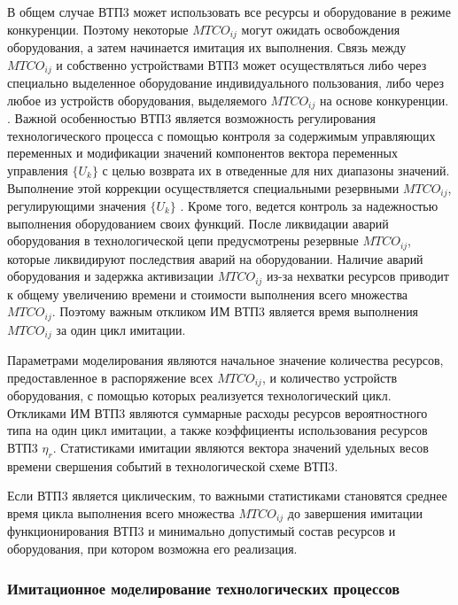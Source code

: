В общем случае ВТП3 может использовать все ресурсы и оборудование в режиме конкуренции. Поэтому некоторые $MTCO_{ij}$ могут ожидать освобождения оборудования, а затем начинается имитация их выполнения. Связь между $MTCO_{ij}$ и собственно устройствами ВТП3 может осуществляться либо через специально выделенное оборудование индивидуального пользования, либо через любое из устройств оборудования, выделяемого $MTCO_{ij}$ на основе конкуренции. . Важной особенностью ВТП3 является возможность регулирования технологического процесса с помощью контроля за содержимым управляющих переменных и модификации значений компонентов вектора переменных управления $\{U_k\}$ с целью возврата их в отведенные для них диапазоны значений. Выполнение этой коррекции осуществляется специальными резервными $MTCO_{ij}$, регулирующими значения $\{U_k\}$ . Кроме того, ведется контроль за надежностью выполнения оборудованием своих функций. После ликвидации аварий оборудования в технологической цепи предусмотрены резервные $MTCO_{ij}$, которые ликвидируют последствия аварий на оборудовании. Наличие аварий оборудования и задержка активизации $MTCO_{ij}$ из-за нехватки ресурсов приводит к общему увеличению времени и стоимости выполнения всего множества {$MTCO_{ij}$}. Поэтому важным откликом ИМ ВТП3 является время выполнения {$MTCO_{ij}$} за один цикл имитации.

Параметрами моделирования являются начальное значение количества ресурсов, предоставленное в распоряжение всех $MTCO_{ij}$, и количество устройств оборудования, с помощью которых реализуется технологический цикл. Откликами ИМ ВТП3 являются суммарные расходы ресурсов вероятностного типа на один цикл имитации, а также коэффициенты использования ресурсов ВТП3 {$\eta_{r}$}. Статистиками имитации являются вектора значений удельных весов времени свершения событий в технологической схеме ВТП3.

Если ВТП3 является циклическим, то важными статистиками становятся среднее время цикла выполнения всего множества {$MTCO_{ij}$} до завершения имитации функционирования ВТП3 и минимально допустимый состав ресурсов и оборудования, при котором возможна его реализация.


%

\subsubsection{Имитационное моделирование технологических процессов}

